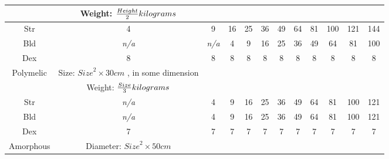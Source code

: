 \documentclass[twoside]{book}
\begin{document}
\begin{table}[htb]
\begin{center}
\begin{tabular}{|c|c|c|c|c|c|c|c|c|c|c|c|}
\hline

& Weight: \begin{math}  {{Height
                    }\over{ 2 }}  kilograms 
                     \end{math}
                  \\

\hline

 Str & 4 & 9 & 16 & 25 & 36 & 49 & 64 & 81 & 100 & 121 & 144 \\

\hline

 Bld &
                    \textit{n/a}
                  &
                    \textit{n/a}
                  & 4 & 9 & 16 & 25 & 36 & 49 & 64 & 81 & 100 \\

\hline

 Dex & 8 & 8 & 8 & 8 & 8 & 8 & 8 & 8 & 8 & 8 & 8 \\

\hline

 Polymelic &  Size: \begin{math}  
                        {Size}^{ 2 }   \times   30 cm
                           \end{math} , in some dimension
                  \\

\hline

& Weight: \begin{math}  {{Size
                    }\over{ 3 }}  kilograms 
                     \end{math}
                  \\

\hline

 Str &
                    \textit{n/a}
                  & 4 & 9 & 16 & 25 & 36 & 49 & 64 & 81 & 100 & 121 \\

\hline

 Bld &
                    \textit{n/a}
                  & 4 & 9 & 16 & 25 & 36 & 49 & 64 & 81 & 100 & 121 \\

\hline

 Dex & 7 & 7 & 7 & 7 & 7 & 7 & 7 & 7 & 7 & 7 & 7 \\

\hline

 Amorphous &  Diameter: \begin{math}  
                        {Size}^{ 2 }   \times   50 cm
                            \end{math}
                  \\


\end{tabular}
\end{center}
\end{table}
\end{document}
